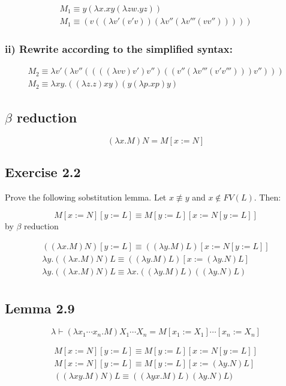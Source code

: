 \documentclass[11pt]{article}
\begin{document}
\begin{gather*}
M_{1} \equiv y (\lambda x.xy (\lambda zw.yz)) \\
M_{1} \equiv (v ((\lambda v'(v'v)) (\lambda v''(\lambda v'''(vv'')))))
\end{gather*}


\subsubsection*{ii) Rewrite according to the simplified syntax:}

\begin{gather*}
M_{2} \equiv \lambda v' (\lambda v''((((\lambda vv) v')v'')((v''(\lambda v'''(v'v''')))v''))) \\
M_{2} \equiv \lambda xy. ((\lambda z.z) xy)(y(\lambda p.xp)y)
\end{gather*}


\subsection*{$\beta$ reduction}
\[
(\lambda x.M)N = M [x:=N]
\]

\subsection*{Exercise 2.2}
 Prove the following sobstitution lemma. Let $x \not\equiv y$ and $x \not\in FV(L)$. Then:
 
\[
M[x:=N][y:=L]\equiv M [y:=L][x:=N[y:=L]]
\]
by $\beta$ reduction

\begin{gather*}
((\lambda x.M)N)[y:=L]\equiv ((\lambda y.M)L)[x:=N[y:=L]] \\
\lambda y.((\lambda x.M)N)L\equiv ((\lambda y.M)L)
[x:=(\lambda y.N)L] \\
\lambda y.((\lambda x.M)N)L\equiv \lambda x. ((\lambda y.M)L)((\lambda y.N)L) \\
\end{gather*}


\subsection*{Lemma 2.9}
\[
\lambda \vdash (\lambda x_{1} \cdots x_{n}.M)X_{1} \cdots X_{n} = M [x_{1}:=X_{1}] \cdots [x_{n} := X_{n}]
\]

\begin{gather*}
M[x:=N][y:=L]\equiv M [y:=L][x:=N[y:=L]] \\
M[x:=N][y:=L]\equiv M [y:=L][x:=(\lambda y.N)L] \\
((\lambda xy.M)N)L\equiv ((\lambda yx.M)L)(\lambda y.N)L)
\end{gather*}
\end{document}
